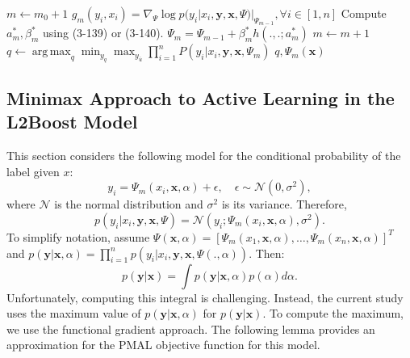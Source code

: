 \documentclass[12pt]{article}
\DeclareMathOperator*{\argmax}{arg\,max}
\begin{document}
	\begin{algorithm}[h!]
		\caption{General Functional Gradient Probabilistic Active Learning}
		\begin{algorithmic}[1]
			\State $m \leftarrow m_0 + 1$
			\State $g_m(y_i, x_i) = \nabla_\Psi \log p(y_i | x_i, \mathbf{y}, \mathbf{x}, \Psi)|_{\Psi_{m-1}}, \forall i \in [1, n]$
			\State Compute $a_m^*, \beta_m^*$ using (3-139) or (3-140).
			\State $\Psi_m = \Psi_{m-1} + \beta_m^* h(., .; a_m^*)$
			\State $m \leftarrow m + 1$
			\EndWhile
			\State $q \leftarrow \argmax_q \min_{y_q} \max_{y_{\bar{u}}} \prod_{i=1}^n P(y_i | x_i, \mathbf{y}, \mathbf{x}, \Psi_m)$
			\State \Return $q, \Psi_m(\mathbf{x})$ 
			\EndProcedure
		\end{algorithmic}
	\end{algorithm}
	
	\subsection{Minimax Approach to Active Learning in the L2Boost Model}
	This section considers the following model for the conditional probability of the label given $x$:
	\begin{equation}
		y_i = \Psi_m(x_i, \mathbf{x}, \alpha) + \epsilon, \quad \epsilon \sim \mathcal{N}(0, \sigma^2),
	\end{equation}
	where $\mathcal{N}$ is the normal distribution and $\sigma^2$ is its variance. Therefore,
	\begin{equation}
		p(y_i | x_i, \mathbf{y}, \mathbf{x}, \Psi) = \mathcal{N}(y_i; \Psi_m(x_i, \mathbf{x}, \alpha), \sigma^2).
	\end{equation}
	To simplify notation, assume $\Psi(\mathbf{x}, \alpha) = [\Psi_m(x_1, \mathbf{x}, \alpha), \ldots, \Psi_m(x_n, \mathbf{x}, \alpha)]^T$ and $p(\mathbf{y}|\mathbf{x}, \alpha) = \prod_{i=1}^{n} p(y_i | x_i, \mathbf{y}, \mathbf{x}, \Psi(., \alpha))$. Then:
	\begin{equation}
		p(\mathbf{y}|\mathbf{x}) = \int p(\mathbf{y}|\mathbf{x}, \alpha) p(\alpha) d\alpha.
	\end{equation}
	Unfortunately, computing this integral is challenging. Instead, the current study uses the maximum value of $p(\mathbf{y}|\mathbf{x}, \alpha)$ for $p(\mathbf{y}|\mathbf{x})$. To compute the maximum, we use the functional gradient approach. The following lemma provides an approximation for the PMAL objective function for this model.
	
\end{document}
